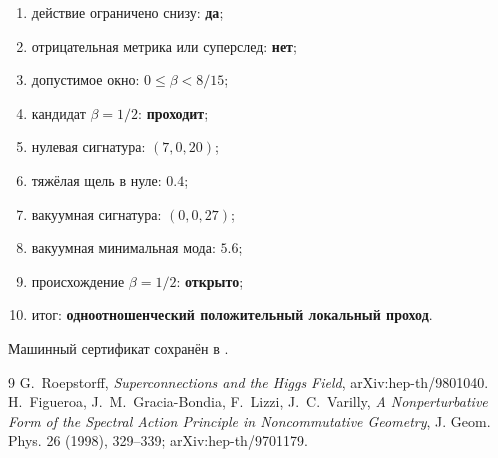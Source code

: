 \begin{protocol}
\begin{enumerate}
 \item действие ограничено снизу: \textbf{да};
 \item отрицательная метрика или суперслед: \textbf{нет};
 \item допустимое окно: \textbf{$0\le\beta<8/15$};
 \item кандидат $\beta=1/2$: \textbf{проходит};
 \item нулевая сигнатура: \textbf{$(7,0,20)$};
 \item тяжёлая щель в нуле: \textbf{$0.4$};
 \item вакуумная сигнатура: \textbf{$(0,0,27)$};
 \item вакуумная минимальная мода: \textbf{$5.6$};
 \item происхождение $\beta=1/2$: \textbf{открыто};
 \item итог: \textbf{одноотношенческий положительный локальный проход}.
\end{enumerate}
\end{protocol}

Машинный сертификат сохранён в
.

\begin{thebibliography}{9}
G.~Roepstorff,
\emph{Superconnections and the Higgs Field}, arXiv:hep-th/9801040.
H.~Figueroa, J.~M.~Gracia-Bondia, F.~Lizzi, J.~C.~Varilly,
\emph{A Nonperturbative Form of the Spectral Action Principle in
Noncommutative Geometry}, J. Geom. Phys. 26 (1998), 329--339;
arXiv:hep-th/9701179.
\end{thebibliography}